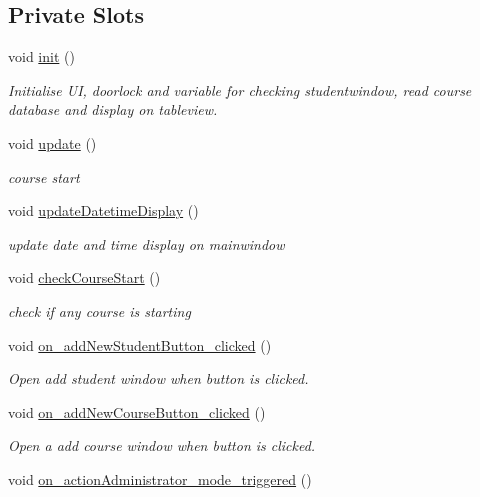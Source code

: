 \subsection*{Private Slots}
\begin{DoxyCompactItemize}
\item 
void \hyperlink{class_main_window_a671e7e5b0a3a7a3fb1cf44c5c8377952}{init} ()
\begin{DoxyCompactList}\small\item\em Initialise U\+I, doorlock and variable for checking studentwindow, read course database and display on tableview. \end{DoxyCompactList}\item 
void \hyperlink{class_main_window_a128f71880d4b9683149023fc46fcc9f8}{update} ()
\begin{DoxyCompactList}\small\item\em course start \end{DoxyCompactList}\item 
void \hyperlink{class_main_window_a719a423fa05029712c4d67b938f4a551}{update\+Datetime\+Display} ()
\begin{DoxyCompactList}\small\item\em update date and time display on mainwindow \end{DoxyCompactList}\item 
void \hyperlink{class_main_window_a8ebe9859eb33fda652cf463cc24fac67}{check\+Course\+Start} ()
\begin{DoxyCompactList}\small\item\em check if any course is starting \end{DoxyCompactList}\item 
void \hyperlink{class_main_window_aaf19111b868ab633946d093bf0c2eb76}{on\+\_\+add\+New\+Student\+Button\+\_\+clicked} ()
\begin{DoxyCompactList}\small\item\em Open add student window when button is clicked. \end{DoxyCompactList}\item 
void \hyperlink{class_main_window_aa977314d191cfe595b9e29e25f80ede8}{on\+\_\+add\+New\+Course\+Button\+\_\+clicked} ()
\begin{DoxyCompactList}\small\item\em Open a add course window when button is clicked. \end{DoxyCompactList}\item 
void \hyperlink{class_main_window_a1db37ef042ec5f2d06a4a4eddb93b899}{on\+\_\+action\+Administrator\+\_\+mode\+\_\+triggered} ()

\end{DoxyCompactItemize}
